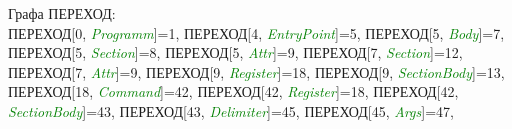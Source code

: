 \documentclass[a0]{a0poster}
\begin{document}
Графа ПЕРЕХОД:\\
ПЕРЕХОД[0, \textcolor{Green}{\textit{Programm}}]=1, ПЕРЕХОД[4, \textcolor{Green}{\textit{EntryPoint}}]=5, ПЕРЕХОД[5, \textcolor{Green}{\textit{Body}}]=7, ПЕРЕХОД[5, \textcolor{Green}{\textit{Section}}]=8, ПЕРЕХОД[5, \textcolor{Green}{\textit{Attr}}]=9, ПЕРЕХОД[7, \textcolor{Green}{\textit{Section}}]=12, ПЕРЕХОД[7, \textcolor{Green}{\textit{Attr}}]=9, ПЕРЕХОД[9, \textcolor{Green}{\textit{Register}}]=18, ПЕРЕХОД[9, \textcolor{Green}{\textit{SectionBody}}]=13, ПЕРЕХОД[18, \textcolor{Green}{\textit{Command}}]=42, ПЕРЕХОД[42, \textcolor{Green}{\textit{Register}}]=18, ПЕРЕХОД[42, \textcolor{Green}{\textit{SectionBody}}]=43, ПЕРЕХОД[43, \textcolor{Green}{\textit{Delimiter}}]=45, ПЕРЕХОД[45, \textcolor{Green}{\textit{Args}}]=47, 
\\
 
\end{document}

